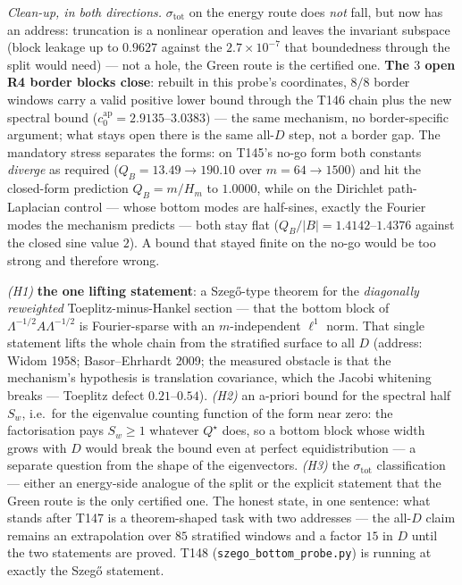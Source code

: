 \documentclass[11pt,a4paper]{article}
\begin{document}
\emph{Clean-up, in both directions.} $\sigma_{\mathrm{tot}}$ on the energy route does \emph{not}
fall, but now has an address: truncation is a nonlinear operation and leaves the invariant
subspace (block leakage up to $0.9627$ against the $2.7\times10^{-7}$ that boundedness through
the split would need) --- not a hole, the Green route is the certified one. \textbf{The $3$ open
R4 border blocks close}: rebuilt in this probe's coordinates, $8/8$ border windows carry a valid
positive lower bound through the T146 chain plus the new spectral bound
($c_0^{\mathrm{ap}}=2.9135$--$3.0383$) --- the same mechanism, no border-specific argument; what
stays open there is the same all-$D$ step, not a border gap. The mandatory stress separates the
forms: on T145's no-go form both constants \emph{diverge} as required ($Q_B=13.49\to190.10$ over
$m=64\to1500$) and hit the closed-form prediction $Q_B=m/H_m$ to $1.0000$, while on the Dirichlet
path-Laplacian control --- whose bottom modes are half-sines, exactly the Fourier modes the
mechanism predicts --- both stay flat ($Q_B/|B|=1.4142$--$1.4376$ against the closed sine value
$2$). A bound that stayed finite on the no-go would be too strong and therefore wrong.

\begin{keybox}
\emph{(H1)} \textbf{the one lifting statement}: a Szeg\H{o}-type theorem for the \emph{diagonally
reweighted} Toeplitz-minus-Hankel section --- that the bottom block of
$\Lambda^{-1/2}A\Lambda^{-1/2}$ is Fourier-sparse with an $m$-independent $\ell^1$ norm. That
single statement lifts the whole chain from the stratified surface to all $D$ (address: Widom
1958; Basor--Ehrhardt 2009; the measured obstacle is that the mechanism's hypothesis is
translation covariance, which the Jacobi whitening breaks --- Toeplitz defect $0.21$--$0.54$).
\emph{(H2)} an a-priori bound for the spectral half $S_w$, i.e.\ for the eigenvalue counting
function of the form near zero: the factorisation pays $S_w\ge1$ whatever $Q^\star$ does, so a
bottom block whose width grows with $D$ would break the bound even at perfect equidistribution ---
a separate question from the shape of the eigenvectors. \emph{(H3)} the $\sigma_{\mathrm{tot}}$
classification --- either an energy-side analogue of the split or the explicit statement that the
Green route is the only certified one. The honest state, in one sentence: what stands after T147
is a theorem-shaped task with two addresses --- the all-$D$ claim remains an extrapolation over
$85$ stratified windows and a factor $15$ in $D$ until the two statements are proved.
T148 (\texttt{szego\_bottom\_probe.py}) is running at exactly the Szeg\H{o} statement.
\end{keybox}
\end{document}
